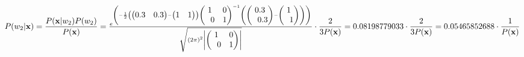\documentclass[12pt]{article}
\begin{document}
$P(w_2|\bold{x}) = \dfrac{P(\bold{x}|w_2)P(w_2)}{P(\bold{x}) }  =  \frac{e^{\left(-\frac{1}{2}\left(\begin{pmatrix}0.3&0.3\end{pmatrix}-\begin{pmatrix}1&1\end{pmatrix}\right)\begin{pmatrix}1&0\\ \:\:\:0&1\end{pmatrix}^{-1}\left(\begin{pmatrix}0.3\\ \:\:\:0.3\end{pmatrix}-\begin{pmatrix}1\\ \:\:\:1\end{pmatrix}\right)\right)}}{\sqrt{\left(2\pi \right)^2\left|\begin{pmatrix}1&0\\ \:\:\:0&1\end{pmatrix}\right|}} \cdot \dfrac{2}{3P(\bold{x})} =0.08198779033 \cdot \dfrac{2}{3P(\bold{x})}= 0.05465852688 \cdot \dfrac{1}{P(\bold{x})}  $\\\\
\end{document}
